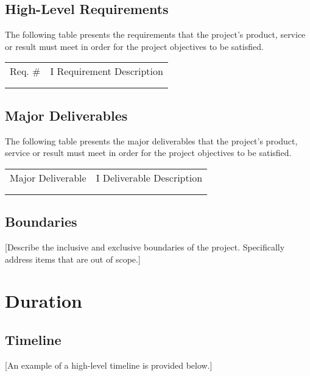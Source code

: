 \documentclass[a4paper, 11pt]{article}
\begin{document}
\hypertarget{high-level-requirements}{%
\subsection{High-Level Requirements}\label{high-level-requirements}}

The following table presents the requirements that the project's
product, service or result must meet in order for the project objectives
to be satisfied.

\begin{longtable}[]{@{}ll@{}}
\toprule
\endhead
Req. \# & I Requirement Description\tabularnewline
&\tabularnewline
&\tabularnewline
\bottomrule
\end{longtable}

\hypertarget{major-deliverables}{%
\subsection{Major Deliverables}\label{major-deliverables}}

The following table presents the major deliverables that the project's
product, service or result must meet in order for the project objectives
to be satisfied.

\begin{longtable}[]{@{}ll@{}}
\toprule
\endhead
Major Deliverable & I Deliverable Description\tabularnewline
&\tabularnewline
&\tabularnewline
\bottomrule
\end{longtable}

\hypertarget{boundaries}{%
\subsection{Boundaries}\label{boundaries}}

{[}Describe the inclusive and exclusive boundaries of the project.
Specifically address items that are out of scope.{]}

\hypertarget{duration}{%
\section{Duration}\label{duration}}

\hypertarget{timeline}{%
\subsection{Timeline}\label{timeline}}

{[}An example of a high-level timeline is provided below.{]}
\end{document}
